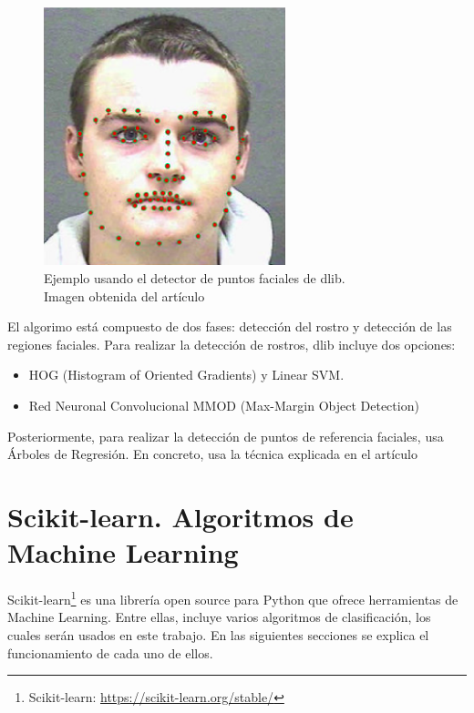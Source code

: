 \begin{figure} [h!]
  \begin{center}
    \includegraphics[width=70mm]{figs/dlib_example.png}
  \end{center}
  \captionsetup{justification=centering}
  \caption{Ejemplo usando el detector de puntos faciales de dlib.\\
  Imagen obtenida del artículo \cite{dlib_example}}
  \label{fig:dlib_example}
\end{figure}

El algorimo está compuesto de dos fases: detección del rostro y detección de las regiones faciales. Para realizar la detección de rostros, dlib incluye dos opciones:

\begin{itemize}
    \item HOG (Histogram of Oriented Gradients) y Linear SVM.
    \item Red Neuronal Convolucional MMOD (Max-Margin Object Detection)
\end{itemize}

Posteriormente, para realizar la detección de puntos de referencia faciales, usa Árboles de Regresión. En concreto, usa la técnica explicada en el artículo \cite{facial_landmarks_dlib}

\section{Scikit-learn. Algoritmos de Machine Learning}
\label{sec:sklearn}

Scikit-learn\footnote{Scikit-learn: \url{https://scikit-learn.org/stable/}} es una librería open source para Python que ofrece herramientas de Machine Learning. Entre ellas, incluye varios algoritmos de clasificación, los cuales serán usados en este trabajo. En las siguientes secciones se explica el funcionamiento de cada uno de ellos.

